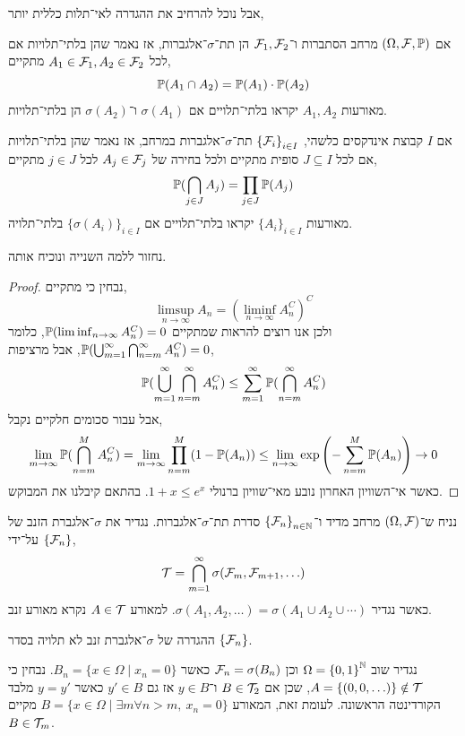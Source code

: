 אבל נוכל להרחיב את ההגדרה לאי־תלות כללית יותר,
\begin{definition}
	אם $(\Omega, \mathcal{F}, \mathbb{P})$ מרחב הסתברות ו־$\mathcal{F}_1, \mathcal{F}_2$ הן תת־$\sigma$־אלגברות,
	אז נאמר שהן בלתי־תלויות אם לכל $A_1 \in \mathcal{F}_1, A_2 \in \mathcal{F}_2$ מתקיים,
	\[
		\mathbb{P}(A_1 \cap A_2)
		= \mathbb{P}(A_1) \cdot \mathbb{P}(A_2)
	\]
	מאורעות $A_1, A_2$ יקראו בלתי־תלויים אם $\sigma(A_1)$ ו־$\sigma(A_2)$ הן בלתי־תלויות.
\end{definition}
\begin{definition}
	אם $I$ קבוצת אינדקסים כלשהי, ${\{ \mathcal{F}_i \}}_{i \in I}$ תת־$\sigma$־אלגברות במרחב,
	אז נאמר שהן בלתי־תלויות אם לכל $J \subseteq I$ סופית מתקיים ולכל בחירה של $A_j \in \mathcal{F}_j$ לכל $j \in J$ מתקיים,
	\[
		\mathbb{P}(\bigcap_{j \in J} A_j)
		= \prod_{j \in J} \mathbb{P}(A_j)
	\]
	מאורעות ${\{ A_i \}}_{i \in I}$ יקראו בלתי־תלויים אם ${\{ \sigma(A_i) \}}_{i \in I}$ בלתי־תלויה.
\end{definition}
נחזור ללמה השנייה ונוכיח אותה.
\begin{proof}
	נבחין כי מתקיים,
	\[
		\limsup_{n \to \infty} A_n
		= {\left(\liminf_{n \to \infty} A_n^C\right)}^C
	\]
	ולכן אנו רוצים להראות שמתקיים $\mathbb{P}(\liminf_{n \to \infty} A_n^C) = 0$, כלומר $\mathbb{P}(\bigcup_{m = 1}^{\infty} \bigcap_{n = m}^{\infty} A_n^C) = 0$, אבל מרציפות,
	\[
		\mathbb{P}(\bigcup_{m = 1}^{\infty} \bigcap_{n = m}^{\infty} A_n^C)
		\le \sum_{m = 1}^\infty \mathbb{P}(\bigcap_{n = m}^\infty A_n^C)
	\]
	אבל עבור סכומים חלקיים נקבל,
	\[
		\lim_{m \to \infty} \mathbb{P}(\bigcap_{n = m}^M A_n^C)
		= \lim_{m \to \infty} \prod_{n = m}^M (1 - \mathbb{P}(A_n))
		\le \lim_{n \to \infty} \exp\left(- \sum_{n = m}^M \mathbb{P}(A_n)\right)
		\to 0
	\]
	כאשר אי־השוויון האחרון נובע מאי־שוויון ברנולי $1 + x \le e^x$.
	בהתאם קיבלנו את המבוקש.
\end{proof}
\begin{definition}
	נניח ש־$(\Omega, \mathcal{F})$ מרחב מדיד ו־${\{ \mathcal{F}_n \}}_{n \in \mathbb{N}}$ סדרת תת־$\sigma$־אלגברות.
	נגדיר את $\sigma$־אלגברת הזנב של $\{ \mathcal{F}_n \}$ על־ידי,
	\[
		\mathcal{T}
		= \bigcap_{m = 1}^\infty \sigma(\mathcal{F}_m, \mathcal{F}_{m + 1}, \ldots)
	\]
	כאשר נגדיר $\sigma(A_1, A_2, \ldots) = \sigma(A_1 \cup A_2 \cup \cdots)$.
	למאורע $A \in \mathcal{T}$ נקרא מאורע זנב.
\end{definition}
\begin{remark}
	ההגדרה של $\sigma$־אלגברת זנב לא תלויה בסדר $\{ \mathcal{F}_n \}$.
\end{remark}
\begin{example}
	נגדיר שוב $\Omega = {\{ 0, 1 \}}^{\mathbb{N}}$ וכן $\mathcal{F}_n = \sigma(B_n)$ כאשר $B_n = \{ x \in \Omega \mid x_n = 0 \}$.
	נבחין כי $A  = \{ (0, 0, \ldots) \} \notin \mathcal{T}$, שכן אם $B \in \mathcal{T}_2$ ו־$y \in B$ אז גם $y' \in B$ כאשר $y = y'$ מלבד הקורדינטה הראשונה.
	לעומת זאת, המאורע $B = \{ x \in \Omega \mid \exists m \forall n > m,\ x_n = 0 \}$ מקיים $B \in \mathcal{T}_m$.
\end{example}
